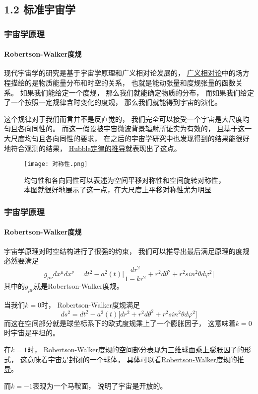\documentclass[8pt]{beamer}
\begin{document}
    \subsection{1.2 标准宇宙学}
        \begin{frame}[fragile]
            \frametitle{宇宙学原理}
            \framesubtitle{Robertson-Walker度规}
            \begin{multicols}{2} 
                \qquad
                现代宇宙学的研究是基于宇宙学原理和广义相对论发展的，
                \hyperlink{附录3}{\underline{广义相对论}}中的场方程描绘的是物质能量分布和时空的关系，
                也就是能动张量和度规张量的函数关系。
                如果我们能给定一个度规，
                那么我们就能确定物质的分布，
                而如果我们给定了一个按照一定规律含时变化的度规，
                那么我们就能得到宇宙的演化。
                
                \qquad
                这个规律对于我们而言并不是反直觉的，
                我们完全可以接受一个宇宙是大尺度均匀且各向同性的。
                而这一假设被宇宙微波背景辐射所证实为有效的，
                且基于这一大尺度均匀且各向同性的要求，
                在之后的宇宙学研究中也发现得到的结果能很好地符合观测的结果，
                \hyperlink{附录1}{\underline{Hubble定律的推导}}就表现出了这点。

                \begin{figure}[h]
                    \centering
                    \texttt{[image: 对称性.png]}  
                    \caption{均匀性和各向同性可以表述为空间平移对称性和空间旋转对称性，
                    本图就很好地展示了这一点，在大尺度上平移对称性尤为明显}
                \end{figure}
            \end{multicols}
        \end{frame}

        \begin{frame}[fragile]
            \frametitle{宇宙学原理}
            \framesubtitle{Robertson-Walker度规}
                \qquad
                宇宙学原理对时空结构进行了很强的约束，
                我们可以推导出最后满足原理的度规必然要满足
                $$g_{\mu\nu}dx^{\mu}dx^{\nu}=dt^2-a^2(t)\bigg[\frac{dr^2}{1-kr^2}+r^2d\theta^2+r^2sin^2\theta d\varphi^2\bigg]$$
                其中的$g_{\mu\nu}$就是Robertson-Walker度规。

                \qquad
                当我们$k=0$时，
                Robertson-Walker度规满足
                $$ds^2=dt^2-a^2(t)\bigg[dr^2+r^2d\theta^2+r^2sin^2\theta d\varphi^2\bigg]$$
                而这在空间部分就是球坐标系下的欧式度规乘上了一个膨胀因子，
                这意味着$k=0$时宇宙是平坦的。

                \qquad
                在$k=1$时，
                \hyperlink{附录4}{\underline{Robertson-Walker度规}}的空间部分表现为三维球面乘上膨胀因子的形式，
                这意味着宇宙是封闭的一个球体，
                具体可以看\hyperlink{附录2}{\underline{Robertson-Walker度规的推导}}。

                \qquad
                而$k=-1$表现为一个马鞍面，
                说明了宇宙是开放的。
        \end{frame}
\end{document}
